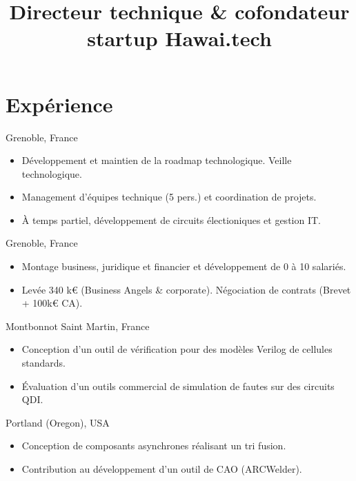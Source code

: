 \documentclass[11pt]{moderncv}
\title{Directeur technique \& cofondateur startup Hawai.tech}
\begin{document}
\maketitle

\vspace{-.75cm}
\section{Expérience}
%
        {Grenoble, France}{}{%
          \begin{itemize}
          \item Développement et maintien de la roadmap technologique. Veille technologique.
          \item Management d'équipes technique (5 pers.) et coordination de projets.
          \item À temps partiel, développement de circuits électioniques et gestion IT.
          \end{itemize}
        }
%
        {Grenoble, France}{}{%
          \begin{itemize}
          \item Montage business, juridique et financier et développement de 0 à 10 salariés.
          \item Levée 340 k€ (Business Angels \& corporate). Négociation de contrats (Brevet + 100k€ CA).
          \end{itemize}
        }
%
        {Montbonnot Saint Martin, France}{}{%
          \begin{itemize}
          \item Conception d'un outil de vérification pour des modèles
            Verilog de cellules standards.
          \item \'Evaluation d'un outils commercial de simulation de
            fautes sur des circuits QDI.
          \end{itemize}
        }
%
        {Portland (Oregon), USA}{}{%
          \begin{itemize}
          \item Conception de composants asynchrones réalisant un tri fusion.
          \item Contribution au développement d'un outil de CAO (ARCWelder).
          \end{itemize}
        }
\end{document}
